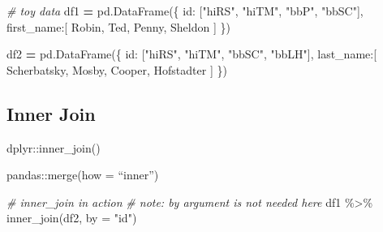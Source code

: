 \documentclass[
]{book}
\newenvironment{Shaded}{\begin{snugshade}}{\end{snugshade}}
\newcommand{\AttributeTok}[1]{\textcolor[rgb]{0.77,0.63,0.00}{#1}}
\newcommand{\CommentTok}[1]{\textcolor[rgb]{0.56,0.35,0.01}{\textit{#1}}}
\newcommand{\FunctionTok}[1]{\textcolor[rgb]{0.00,0.00,0.00}{#1}}
\newcommand{\NormalTok}[1]{#1}
\newcommand{\OperatorTok}[1]{\textcolor[rgb]{0.81,0.36,0.00}{\textbf{#1}}}
\newcommand{\SpecialCharTok}[1]{\textcolor[rgb]{0.00,0.00,0.00}{#1}}
\newcommand{\StringTok}[1]{\textcolor[rgb]{0.31,0.60,0.02}{#1}}
\begin{document}
\begin{Shaded}
\begin{Highlighting}[]
\CommentTok{\# toy data}
\NormalTok{df1 }\OperatorTok{=}\NormalTok{ pd.DataFrame(\{}
    \StringTok{\textquotesingle{}id\textquotesingle{}}\NormalTok{: [}\StringTok{"hiRS"}\NormalTok{, }\StringTok{"hiTM"}\NormalTok{,}
           \StringTok{"bbP"}\NormalTok{, }\StringTok{"bbSC"}\NormalTok{],}
    \StringTok{\textquotesingle{}first\_name\textquotesingle{}}\NormalTok{:[}
        \StringTok{\textquotesingle{}Robin\textquotesingle{}}\NormalTok{,}
        \StringTok{\textquotesingle{}Ted\textquotesingle{}}\NormalTok{,}
        \StringTok{\textquotesingle{}Penny\textquotesingle{}}\NormalTok{,}
        \StringTok{\textquotesingle{}Sheldon\textquotesingle{}}
\NormalTok{    ]}
\NormalTok{\})}



\NormalTok{df2 }\OperatorTok{=}\NormalTok{ pd.DataFrame(\{}
    \StringTok{\textquotesingle{}id\textquotesingle{}}\NormalTok{: [}\StringTok{"hiRS"}\NormalTok{, }\StringTok{"hiTM"}\NormalTok{,}
           \StringTok{"bbSC"}\NormalTok{, }\StringTok{"bbLH"}\NormalTok{],}
    \StringTok{\textquotesingle{}last\_name\textquotesingle{}}\NormalTok{:[}
        \StringTok{\textquotesingle{}Scherbatsky\textquotesingle{}}\NormalTok{,}
        \StringTok{\textquotesingle{}Mosby\textquotesingle{}}\NormalTok{,}
        \StringTok{\textquotesingle{}Cooper\textquotesingle{}}\NormalTok{,}
        \StringTok{\textquotesingle{}Hofstadter\textquotesingle{}}
\NormalTok{    ]}
\NormalTok{\})}
\end{Highlighting}
\end{Shaded}

\hypertarget{inner-join}{%
\subsection{Inner Join}\label{inner-join}}

dplyr::inner\_join()

pandas::merge(how = ``inner'')

\begin{Shaded}
\begin{Highlighting}[]
\CommentTok{\# inner\_join in action}
\CommentTok{\# note: by argument is not needed here}
\NormalTok{df1 }\SpecialCharTok{\%\textgreater{}\%} \FunctionTok{inner\_join}\NormalTok{(df2, }\AttributeTok{by =} \StringTok{"id"}\NormalTok{)}
\end{Highlighting}
\end{Shaded}
\end{document}
